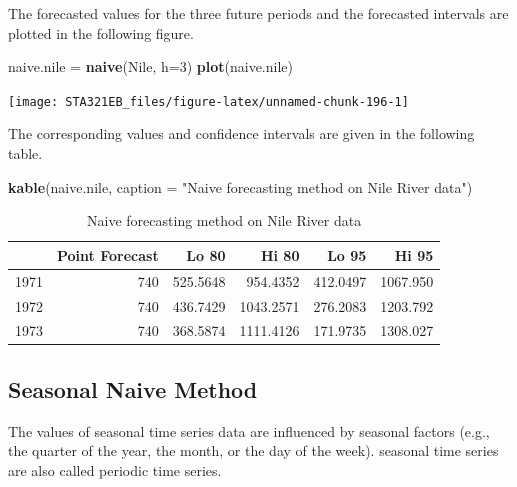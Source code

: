 \documentclass[
]{book}
\newenvironment{Shaded}{\begin{snugshade}}{\end{snugshade}}
\newcommand{\AttributeTok}[1]{\textcolor[rgb]{0.13,0.29,0.53}{#1}}
\newcommand{\DecValTok}[1]{\textcolor[rgb]{0.00,0.00,0.81}{#1}}
\newcommand{\FunctionTok}[1]{\textcolor[rgb]{0.13,0.29,0.53}{\textbf{#1}}}
\newcommand{\NormalTok}[1]{#1}
\newcommand{\OtherTok}[1]{\textcolor[rgb]{0.56,0.35,0.01}{#1}}
\newcommand{\StringTok}[1]{\textcolor[rgb]{0.31,0.60,0.02}{#1}}
\begin{document}
The forecasted values for the three future periods and the forecasted intervals are plotted in the following figure.

\begin{Shaded}
\begin{Highlighting}[]
\NormalTok{naive.nile }\OtherTok{=} \FunctionTok{naive}\NormalTok{(Nile, }\AttributeTok{h=}\DecValTok{3}\NormalTok{)}
\FunctionTok{plot}\NormalTok{(naive.nile)}
\end{Highlighting}
\end{Shaded}

\begin{center}\texttt{[image: STA321EB\_files/figure-latex/unnamed-chunk-196-1]} \end{center}

The corresponding values and confidence intervals are given in the following table.

\begin{Shaded}
\begin{Highlighting}[]
\FunctionTok{kable}\NormalTok{(naive.nile, }\AttributeTok{caption =} \StringTok{"Naive forecasting method on Nile River data"}\NormalTok{)}
\end{Highlighting}
\end{Shaded}

\begin{table}

\caption{\label{tab:unnamed-chunk-197}Naive forecasting method on Nile River data}
\centering
\begin{tabular}[t]{l|r|r|r|r|r}
\hline
  & Point Forecast & Lo 80 & Hi 80 & Lo 95 & Hi 95\\
\hline
1971 & 740 & 525.5648 & 954.4352 & 412.0497 & 1067.950\\
\hline
1972 & 740 & 436.7429 & 1043.2571 & 276.2083 & 1203.792\\
\hline
1973 & 740 & 368.5874 & 1111.4126 & 171.9735 & 1308.027\\
\hline
\end{tabular}
\end{table}

\hypertarget{seasonal-naive-method}{%
\subsection{Seasonal Naive Method}\label{seasonal-naive-method}}

The values of seasonal time series data are influenced by seasonal factors (e.g., the quarter of the year, the month, or the day of the week). seasonal time series are also called periodic time series.
\end{document}
